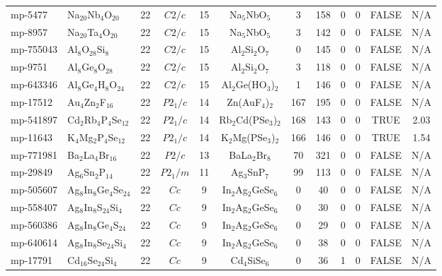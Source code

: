{\begin{longtable}{llcccccccccc}
    mp-5477 & Na$_{20}$Nb$_{4}$O$_{20}$ & 22    & $C2/c$ & 15    & Na$_{5}$NbO$_{5}$ & 3     & 158   & 0     & 0     & FALSE & N/A \\
    mp-8957 & Na$_{20}$Ta$_{4}$O$_{20}$ & 22    & $C2/c$ & 15    & Na$_{5}$NbO$_{5}$ & 3     & 142   & 0     & 0     & FALSE & N/A \\
    mp-755043 & Al$_{8}$O$_{28}$Si$_{8}$ & 22    & $C2/c$ & 15    & Al$_{2}$Si$_{2}$O$_{7}$ & 0     & 145   & 0     & 0     & FALSE & N/A \\
    mp-9751 & Al$_{8}$Ge$_{8}$O$_{28}$ & 22    & $C2/c$ & 15    & Al$_{2}$Si$_{2}$O$_{7}$ & 3     & 118   & 0     & 0     & FALSE & N/A \\
    mp-643346 & Al$_{8}$Ge$_{4}$H$_{8}$O$_{24}$ & 22    & $C2/c$ & 15    & Al$_{2}$Ge(HO$_{3}$)$_{2}$ & 1     & 146   & 0     & 0     & FALSE & N/A \\
    mp-17512 & Au$_{4}$Zn$_{2}$F$_{16}$ & 22    & $P2_1/c$ & 14    & Zn(AuF$_{4}$)$_{2}$ & 167   & 195   & 0     & 0     & FALSE & N/A \\
    mp-541897 & Cd$_{2}$Rb$_{4}$P$_{4}$Se$_{12}$ & 22    & $P2_1/c$ & 14    & Rb$_{2}$Cd(PSe$_{3}$)$_{2}$ & 168   & 143   & 0     & 0     & TRUE  & 2.03  \\
    mp-11643 & K$_{4}$Mg$_{2}$P$_{4}$Se$_{12}$ & 22    & $P2_1/c$ & 14    & K$_{2}$Mg(PSe$_{3}$)$_{2}$ & 166   & 146   & 0     & 0     & TRUE  & 1.54  \\
    mp-771981 & Ba$_{2}$La$_{4}$Br$_{16}$ & 22    & $P2/c$ & 13    & BaLa$_{2}$Br$_{8}$ & 70    & 321   & 0     & 0     & FALSE & N/A \\
    mp-29849 & Ag$_{6}$Sn$_{2}$P$_{14}$ & 22    & $P2_1/m$ & 11    & Ag$_{3}$SnP$_{7}$ & 99    & 113   & 0     & 0     & FALSE & N/A \\
    mp-505607 & Ag$_{8}$In$_{8}$Ge$_{4}$Se$_{24}$ & 22    & $Cc$  & 9     & In$_{2}$Ag$_{2}$GeSe$_{6}$ & 0     & 40    & 0     & 0     & FALSE & N/A \\
    mp-558407 & Ag$_{8}$In$_{8}$S$_{24}$Si$_{4}$ & 22    & $Cc$  & 9     & In$_{2}$Ag$_{2}$GeSe$_{6}$ & 0     & 30    & 0     & 0     & FALSE & N/A \\
    mp-560386 & Ag$_{8}$In$_{8}$Ge$_{4}$S$_{24}$ & 22    & $Cc$  & 9     & In$_{2}$Ag$_{2}$GeSe$_{6}$ & 0     & 29    & 0     & 0     & FALSE & N/A \\
    mp-640614 & Ag$_{8}$In$_{8}$Se$_{24}$Si$_{4}$ & 22    & $Cc$  & 9     & In$_{2}$Ag$_{2}$GeSe$_{6}$ & 0     & 38    & 0     & 0     & FALSE & N/A \\
    mp-17791 & Cd$_{16}$Se$_{24}$Si$_{4}$ & 22    & $Cc$  & 9     & Cd$_{4}$SiSe$_{6}$ & 0     & 36    & 1     & 0     & FALSE & N/A \\

\end{longtable}}
